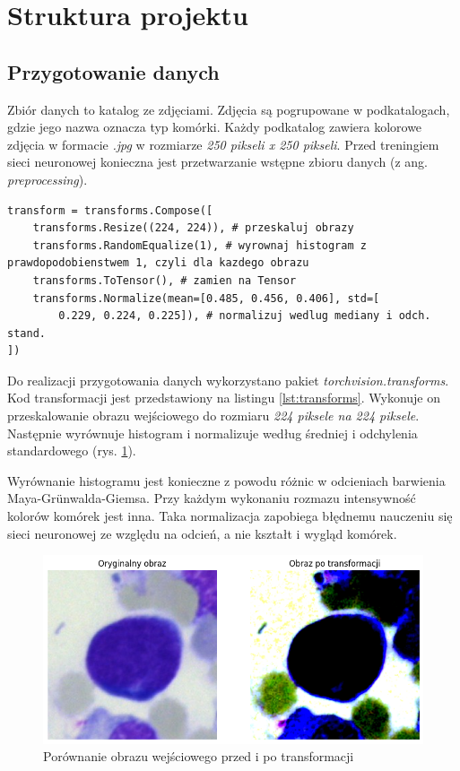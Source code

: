 \section{Struktura projektu}

\subsection{Przygotowanie danych}

Zbiór danych to katalog ze zdjęciami. Zdjęcia są pogrupowane w podkatalogach, gdzie jego nazwa oznacza typ komórki.
Każdy podkatalog zawiera kolorowe zdjęcia w formacie \textit{.jpg} w rozmiarze \textit{250 pikseli x 250 pikseli}.
Przed treningiem sieci neuronowej konieczna jest przetwarzanie wstępne zbioru danych (z ang. \textit{preprocessing}).

\begin{lstlisting}[language=ipython,caption={Transformacja danych}, label={lst:transforms}]
transform = transforms.Compose([
    transforms.Resize((224, 224)), # przeskaluj obrazy
    transforms.RandomEqualize(1), # wyrownaj histogram z prawdopodobienstwem 1, czyli dla kazdego obrazu
    transforms.ToTensor(), # zamien na Tensor
    transforms.Normalize(mean=[0.485, 0.456, 0.406], std=[
        0.229, 0.224, 0.225]), # normalizuj wedlug mediany i odch. stand.
])
\end{lstlisting}

Do realizacji przygotowania danych wykorzystano pakiet \textit{torchvision.transforms}.
Kod transformacji jest przedstawiony na listingu \ref{lst:transforms}.
Wykonuje on przeskalowanie obrazu wejściowego do rozmiaru \textit{224 piksele na 224 piksele}.
Następnie wyrównuje histogram i normalizuje według średniej i odchylenia standardowego (rys. \ref{fig:transformations_example}).

Wyrównanie histogramu jest konieczne z powodu różnic w odcieniach barwienia Maya-Grünwalda-Giemsa.
Przy każdym wykonaniu rozmazu intensywność kolorów komórek jest inna.
Taka normalizacja zapobiega błędnemu nauczeniu się sieci neuronowej ze względu na odcień, a nie kształt i wygląd komórek.

\begin{figure}
    \centering
    \includegraphics[width=\textwidth]{image_transform}
    \caption{Porównanie obrazu wejściowego przed i po transformacji}
    \label{fig:transformations_example}
\end{figure}

